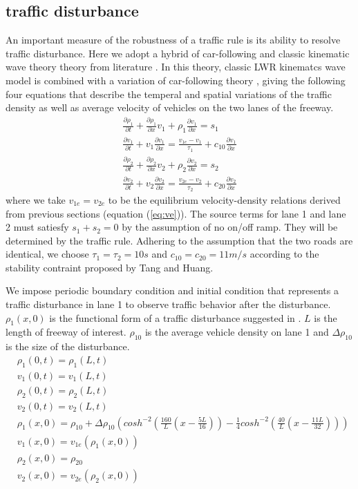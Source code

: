 \documentclass[aps,prl,superscriptaddress,12pt]{revtex4-1}
\begin{document}
	\subsection{traffic disturbance}
	An important measure of the robustness of a traffic rule is its ability to resolve traffic disturbance. Here we adopt a hybrid of car-following and classic kinematic wave theory theory from literature \cite{tang_2004}.  In this theory, classic LWR kinematcs wave model \cite{lighthill_1955,richards_1955} is combined with a variation of car-following theory \cite{jiang_2002}, giving the following four equations that describe the temperal and spatial variations of the traffic density as well as average velocity of vehicles on the two lanes of the freeway.
	\begin{align} \label{eq:pde}
	& \frac{\partial \rho_1}{\partial t} + \frac{\partial \rho_1}{\partial x}v_1+\rho_1\frac{\partial v_1}{\partial x}=s_1 & \\
	& \frac{\partial v_1}{\partial t} + v_1\frac{\partial v_1}{\partial x} = \frac{v_{1e}-v_1}{\tau_1}+c_{10}\frac{\partial v_1}{\partial x} & \\
	& \frac{\partial \rho_2}{\partial t} + \frac{\partial \rho_2}{\partial x}v_2+\rho_2\frac{\partial v_2}{\partial x}=s_2 & \\
	& \frac{\partial v_2}{\partial t} + v_2\frac{\partial v_2}{\partial x} = \frac{v_{2e}-v_2}{\tau_2}+c_{20}\frac{\partial v_2}{\partial x} &
	\end{align}
	where we take $v_{1e} = v_{2e}$ to be the equilibrium velocity-density relations derived from previous sections (equation (\ref{eq:ve})). The source terms for lane 1 and lane 2 must satiesfy  $s_1+s_2=0$ by the assumption of no on/off ramp. They will be determined by the traffic rule. Adhering to the assumption that the two roads are identical, we choose $\tau_1=\tau_2=10s$ and $c_{10}=c_{20}=11m/s$ according to the stability contraint proposed by Tang and Huang\citep{tang_2004}.
	
	We impose periodic boundary condition and initial condition that represents a traffic disturbance in lane 1 to observe traffic behavior after the disturbance. $\rho_1(x,0)$ is the functional form of a traffic disturbance suggested in \citep{tang_2004}. $L$ is the length of freeway of interest. $\rho_{10}$ is the average vehicle density on lane 1 and $\Delta \rho_{10}$ is the size of the disturbance. 
	\begin{align}
	& \rho_1(0,t) = \rho_1(L,t) & \\
	& v_1(0,t) = v_1(L,t) & \\
	& \rho_2(0,t) = \rho_2(L,t) & \\
	& v_2(0,t) = v_2(L,t) & \\
	&\rho_1(x,0)=\rho_{10}+\Delta \rho_{10}\left(  cosh^{-2}(\frac{160}{L}(x-\frac{5L}{16}))-\frac{1}{4}cosh^{-2}(\frac{40}{L}(x-\frac{11L}{32})) \right)& \\
	& v_1(x,0) = v_{1e}(\rho_1(x,0)) & \\
	&\rho_2(x,0)= \rho_{20}& \\ \label{eq:ic}
	& v_2(x,0) = v_{2e}(\rho_2(x,0)) & \\
	\end{align}
		
\end{document}
